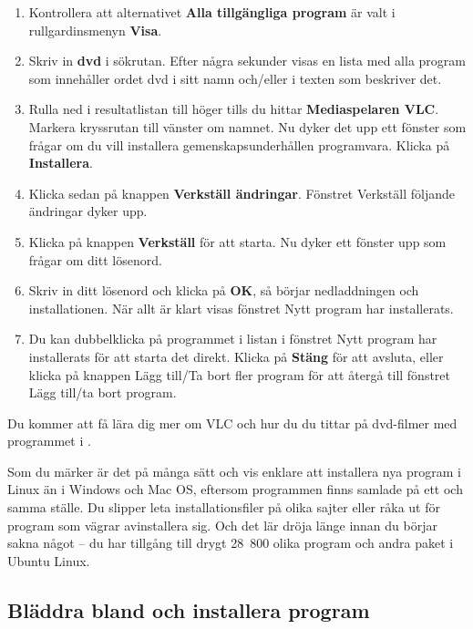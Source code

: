 \documentclass[a4paper,final]{memoir} %
\newcommand\xpackagecount{28~800} %
\begin{document}
\begin{enumerate}

\item Kontrollera att alternativet \textbf{Alla tillgängliga program} är valt i rullgardinsmenyn \textbf{Visa}.
\item Skriv in \textbf{dvd} i sökrutan. Efter några sekunder visas en lista med alla program som innehåller ordet dvd i sitt namn och/eller i texten som beskriver det. 
\item Rulla ned i resultatlistan till höger tills du hittar \textbf{Mediaspelaren VLC}. Markera kryssrutan till vänster om namnet. Nu dyker det upp ett fönster som frågar om du vill installera gemenskapsunderhållen programvara. Klicka på \textbf{Installera}.
\item Klicka sedan på knappen \textbf{Verkställ ändringar}. Fönstret Verkställ följande ändringar dyker upp.
\item Klicka på knappen \textbf{Verkställ} för att starta. Nu dyker ett fönster upp som frågar om ditt lösenord.
\item Skriv in ditt lösenord och klicka på \textbf{OK}, så börjar nedladdningen och installationen. När allt är klart visas fönstret Nytt program har installerats. 
\item Du kan dubbelklicka på programmet i listan i fönstret Nytt program har installerats för att starta det direkt. Klicka på \textbf{Stäng} för att avsluta, eller klicka på knappen Lägg till/Ta bort fler program för att återgå till fönstret Lägg till/ta bort program.

\end{enumerate}

Du kommer att få lära dig mer om VLC och hur du du tittar på dvd-filmer med programmet i .


Som du märker är det på många sätt och vis enklare att installera nya program i Linux än i Windows och Mac OS, eftersom programmen finns samlade på ett och samma ställe. Du slipper leta installationsfiler på olika sajter eller råka ut för program som vägrar avinstallera sig. Och det lär dröja länge innan du börjar sakna något -- du har tillgång till drygt \xpackagecount{} olika program och andra paket i Ubuntu Linux. 

\subsection{Bläddra bland och installera program}
\end{document}
